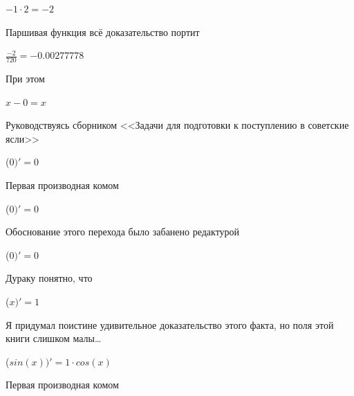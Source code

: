 \documentclass[12pt,a4paper,fleqn]{article}
\begin{document}
\begin{center}
\begin{center}
\begin{center}
\begin{center}
\begin{center}
\begin{center}
\begin{center}
\begin{center}
\begin{center}
\begin{center}
\begin{center}
\begin{center}
\begin{center}
\begin{center}
\begin{center}
\begin{center}
\begin{center}
\begin{center}
\begin{center}
\begin{center}
\begin{center}
\begin{center}
\begin{center}
\begin{center}
\begin{center}
\begin{center}
\begin{center}
\begin{center}
\begin{center}
\begin{center}
\begin{center}
\begin{center}
\begin{center}
\begin{center}
\begin{center}
\begin{center}
\begin{center}
\begin{center}
\begin{center}
\begin{center}
\begin{center}
\begin{center}
\begin{center}
\begin{center}
\begin{center}
\begin{center}
\begin{center}
\begin{center}
\begin{center}
\begin{center}
\begin{center}
\begin{center}
\begin{center}
\begin{center}
\begin{center}$-1 \cdot 2 = -2$\end{center}
Паршивая функция всё доказательство портит\cite{link2}

\begin{center}
\begin{center}$\frac{-2}{720} = -0.00277778$\end{center}
При этом

\begin{center}
$x-0 = x$\end{center}
Руководствуясь сборником <<Задачи для подготовки к поступлению в советские ясли>>\cite{link1}

\begin{center}
 ($0)'
  = 0$\end{center}
Первая производная комом\cite{link2}

\begin{center}
 ($0)'
  = 0$\end{center}
Обоснование этого перехода было забанено редактурой

\begin{center}
 ($0)'
  = 0$\end{center}
Дураку понятно, что

\begin{center}
 ($x)'
  = 1$\end{center}
Я придумал поистине удивительное доказательство этого факта, но поля этой книги слишком малы\ldots

\begin{center}
 ($sin(x))'
  = 1 \cdot cos(x)$\end{center}
Первая производная комом\cite{link2}


\end{center}
\end{center}
\end{center}
\end{center}
\end{center}
\end{center}
\end{center}
\end{center}
\end{center}
\end{center}
\end{center}
\end{center}
\end{center}
\end{center}
\end{center}
\end{center}
\end{center}
\end{center}
\end{center}
\end{center}
\end{center}
\end{center}
\end{center}
\end{center}
\end{center}
\end{center}
\end{center}
\end{center}
\end{center}
\end{center}
\end{center}
\end{center}
\end{center}
\end{center}
\end{center}
\end{center}
\end{center}
\end{center}
\end{center}
\end{center}
\end{center}
\end{center}
\end{center}
\end{center}
\end{center}
\end{center}
\end{center}
\end{center}
\end{center}
\end{center}
\end{center}
\end{center}
\end{center}
\end{center}
\end{center}
\end{document}
